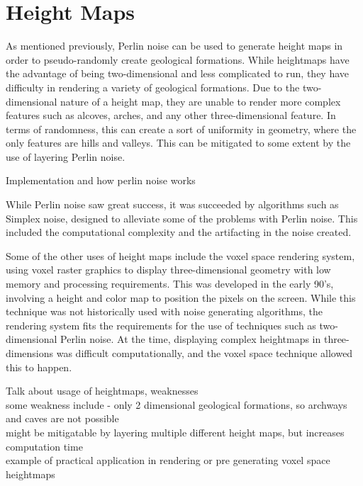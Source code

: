 \documentclass[12pt]{report}
\begin{document}
		
		
	
	\chapter{Height Maps}
		As mentioned previously, Perlin noise can be used to generate height maps in order to pseudo-randomly create geological formations. While heightmaps have the advantage of being two-dimensional and less complicated to run, they have difficulty in rendering a variety of geological formations. Due to the two-dimensional nature of a height map, they are unable to render more complex features such as alcoves, arches, and any other three-dimensional feature. In terms of randomness, this can create a sort of uniformity in geometry, where the only features are hills and valleys. This can be mitigated to some extent by the use of layering Perlin noise.
		
		Implementation and how perlin noise works
		
		\noindent While Perlin noise saw great success, it was succeeded by algorithms such as Simplex noise, designed to alleviate some of the problems with Perlin noise. This included the computational complexity and the artifacting in the noise created. 
		
		
		\noindent Some of the other uses of height maps include the voxel space rendering system, using voxel raster graphics to display three-dimensional geometry with low memory and processing requirements. This was developed in the early 90's, involving a height and color map to position the pixels on the screen. While this technique was not historically used with noise generating algorithms, the rendering system fits the requirements for the use of techniques such as two-dimensional Perlin noise. At the time, displaying complex heightmaps in three-dimensions was difficult computationally, and the voxel space technique allowed this to happen. 
		
		
		Talk about usage of heightmaps, weaknesses\\
		some weakness include - only 2 dimensional geological formations, so archways and caves are not possible \\
		might be mitigatable by layering multiple different height maps, but increases computation time\\
		example of practical application in rendering or pre generating voxel space heightmaps 
	
\end{document}
